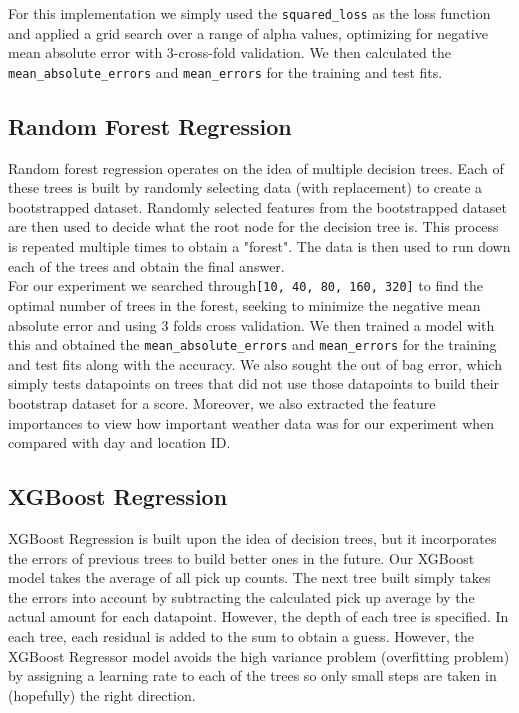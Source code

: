 \documentclass[journal, 12pt]{IEEEtran}
\newcommand{\cc}[1]{\texttt{#1}}
\begin{document}
\noindent For this implementation we simply used the \cc{squared\_loss} as the loss function and applied a grid search over a range of alpha values, optimizing for negative mean absolute error with 3-cross-fold validation. We then calculated the \cc{mean\_absolute\_errors} and \cc{mean\squared\_errors} for the training and test fits. \\

\subsection{Random Forest Regression}

\noindent Random forest regression operates on the idea of multiple decision trees. Each of these trees is built by randomly selecting data (with replacement) to create a bootstrapped dataset. Randomly selected features from the bootstrapped dataset are then used to decide what the root node for the decision tree is. This process is repeated multiple times to obtain a "forest". The data is then used to run down each of the trees and obtain the final answer.\\

\noindent For our experiment we searched through\cc{[10, 40, 80, 160, 320]} to find the optimal number of trees in the forest, seeking to minimize the negative mean absolute error and using 3 folds cross validation. We then trained a model with this and obtained the \cc{mean\_absolute\_errors} and \cc{mean\squared\_errors} for the training and test fits along with the accuracy. We also sought the out of bag error, which simply tests datapoints on trees that did not use those datapoints to build their bootstrap dataset for a score. Moreover, we also extracted the feature importances to view how important weather data was for our experiment when compared with day and location ID. \\

\subsection{XGBoost Regression}

\noindent XGBoost Regression is built upon the idea of decision trees, but it incorporates the errors of previous trees to build better ones in the future. Our XGBoost model takes the average of all pick up counts. The next tree built simply takes the errors into account by subtracting the calculated pick up average by the actual amount for each datapoint. However, the depth of each tree is specified. In each tree, each residual is added to the sum to obtain a guess. However, the XGBoost Regressor model avoids the high variance problem (overfitting problem) by assigning a learning rate to each of the trees so only small steps are taken in (hopefully) the right direction.\\
\end{document}
